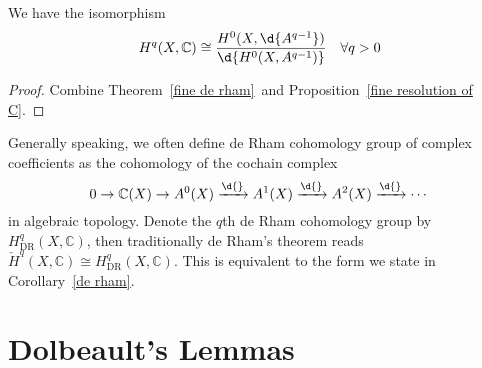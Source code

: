 \begin{cor}\label{de rham}
    We have the isomorphism
    \[H^q(X,\mathbb{C})\cong\frac{H^0(X,\d{A^{q-1}})}{\d{H^0(X,A^{q-1})}}\quad\forall q>0\]
\end{cor}
\begin{proof}
    Combine Theorem~\ref{fine de rham}~and Proposition~\ref{fine resolution of C}.
\end{proof}

\begin{rem}
    Generally speaking, we often define de Rham cohomology group of complex coefficients as the cohomology of the cochain complex
    \[0\to\mathbb{C}(X)\to A^0(X)\xrightarrow{\d{}}A^1(X)\xrightarrow{\d{}}A^2(X)\xrightarrow{\d{}}\cdots\]
    in algebraic topology.
    Denote the $q$th de Rham cohomology group by $H^q_{\mathrm{DR}}(X,\mathbb{C})$, then traditionally de Rham's theorem reads $\check{H}^q(X,\mathbb{C})\cong H^q_{\mathrm{DR}}(X,\mathbb{C})$.
    This is equivalent to the form we state in Corollary~\ref{de rham}.
\end{rem}

\section{Dolbeault's Lemmas}